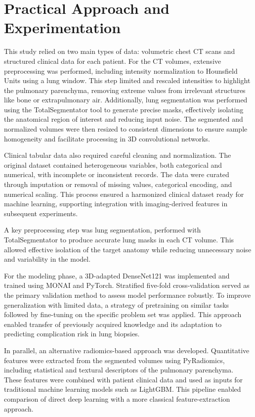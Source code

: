\section*{Practical Approach and Experimentation}

This study relied on two main types of data: volumetric chest CT scans and structured clinical data for each patient. For the CT volumes, extensive preprocessing was performed, including intensity normalization to Hounsfield Units using a lung window. This step limited and rescaled intensities to highlight the pulmonary parenchyma, removing extreme values from irrelevant structures like bone or extrapulmonary air. Additionally, lung segmentation was performed using the TotalSegmentator tool to generate precise masks, effectively isolating the anatomical region of interest and reducing input noise. The segmented and normalized volumes were then resized to consistent dimensions to ensure sample homogeneity and facilitate processing in 3D convolutional networks.

Clinical tabular data also required careful cleaning and normalization. The original dataset contained heterogeneous variables, both categorical and numerical, with incomplete or inconsistent records. The data were curated through imputation or removal of missing values, categorical encoding, and numerical scaling. This process ensured a harmonized clinical dataset ready for machine learning, supporting integration with imaging-derived features in subsequent experiments.

A key preprocessing step was lung segmentation, performed with TotalSegmentator to produce accurate lung masks in each CT volume. This allowed effective isolation of the target anatomy while reducing unnecessary noise and variability in the model.

For the modeling phase, a 3D-adapted DenseNet121 was implemented and trained using MONAI and PyTorch. Stratified five-fold cross-validation served as the primary validation method to assess model performance robustly. To improve generalization with limited data, a strategy of pretraining on similar tasks followed by fine-tuning on the specific problem set was applied. This approach enabled transfer of previously acquired knowledge and its adaptation to predicting complication risk in lung biopsies.

In parallel, an alternative radiomics-based approach was developed. Quantitative features were extracted from the segmented volumes using PyRadiomics, including statistical and textural descriptors of the pulmonary parenchyma. These features were combined with patient clinical data and used as inputs for traditional machine learning models such as LightGBM. This pipeline enabled comparison of direct deep learning with a more classical feature-extraction approach.

